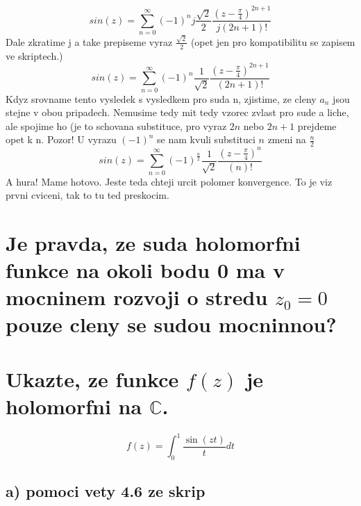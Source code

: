 $$sin(z) = \sum_{n=0}^\infty (-1)^n j \frac{\sqrt{2}}{2}  \frac{(z-\frac{\pi}{4})^{2n+1}}{j(2n+1)!}$$
Dale zkratime j a take prepiseme vyraz $\frac{\sqrt{2}}{2}$ (opet jen pro kompatibilitu se zapisem ve skriptech.)
$$sin(z) = \sum_{n=0}^\infty (-1)^n \frac{1}{\sqrt{2}}  \frac{(z-\frac{\pi}{4})^{2n+1}}{(2n+1)!}$$
Kdyz srovname tento vysledek s vysledkem pro suda n, zjistime, ze cleny $a_n$ jsou stejne v obou pripadech. Nemusime tedy mit tedy vzorec zvlast pro sude a liche, ale spojime ho (je to schovana substituce, pro vyraz $2n$ nebo $2n+1$ prejdeme opet k n. Pozor! U vyrazu $(-1)^n$ se nam kvuli substituci $n$ zmeni na $\frac{n}{2}$
$$sin(z) = \sum_{n=0}^\infty (-1)^\frac{n}{2} \frac{1}{\sqrt{2}}  \frac{(z-\frac{\pi}{4})^{n}}{(n)!}$$
A hura! Mame hotovo. Jeste teda chteji urcit polomer konvergence. To je viz prvni cviceni, tak to tu ted preskocim.


\section{Je pravda, ze suda holomorfni funkce na okoli bodu 0 ma v mocninem rozvoji o stredu $z_0= 0$ pouze cleny se sudou mocninnou?}


\section{Ukazte, ze funkce $f(z)$ je holomorfni na $\mathbb{C}$.}

$$f(z) =\int_0^1 \frac{\operatorname{sin}(zt)}{t}dt$$

\subsection{a) pomoci vety 4.6 ze skrip}

